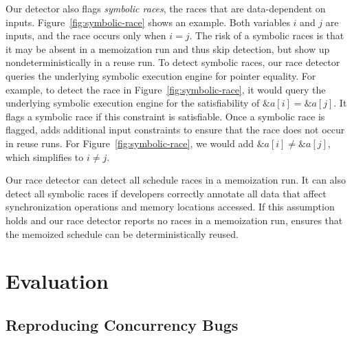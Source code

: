 Our detector also flags \emph{symbolic races}, the races that are
data-dependent on inputs.  Figure~\ref{fig:symbolic-race} shows an example.
Both variables $i$ and $j$ are inputs, and the race occurs only when $i =
j$.  The risk of a symbolic races is that it may be absent in a
memoization run and thus skip detection, but show up nondeterministically
in a reuse run.  To detect symbolic races, our race detector queries the
underlying symbolic execution engine for pointer equality.  For example,
to detect the race in Figure~\ref{fig:symbolic-race}, it would query the
underlying symbolic execution engine for the satisfiability of
$\&a[i]=\&a[j]$.  It flags a symbolic race if this constraint is satisfiable.
Once a symbolic race is flagged, \tern adds additional input constraints to
ensure that the race does not occur in reuse runs.  For
Figure~\ref{fig:symbolic-race}, we would add $\&a[i]\neq \&a[j]$, which
simplifies to $i\neq j$.

Our race detector can detect all schedule races in a memoization run.  It
can also detect all symbolic races if developers correctly annotate all
data that affect synchronization operations and memory locations accessed.
If this assumption holds and our race detector reports no races in a
memoization run, \tern ensures that the memoized schedule can be
deterministically reused.


\section{Evaluation} \label{sec:bugs-evaluation}

\subsection{Reproducing Concurrency Bugs} \label{sec:bug-determinism}

